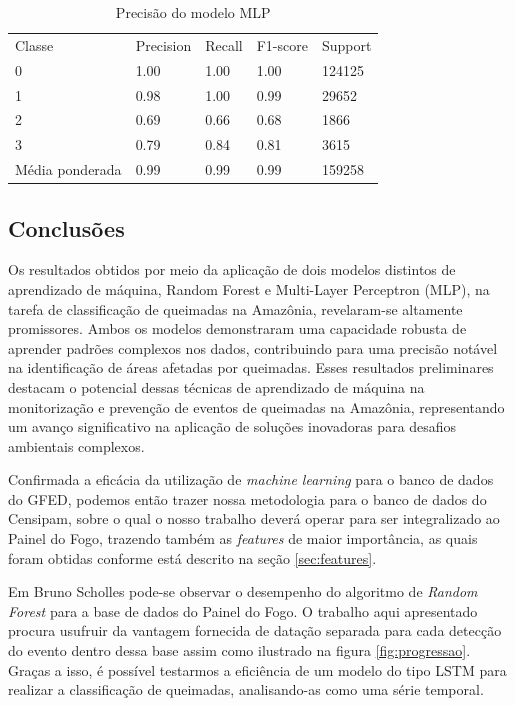 \begin{table}[H]
\centering
\caption{Precisão do modelo MLP}
\label{tab:mlp}
\begin{tabular}{lllll}
Classe          & Precision & Recall & F1-score & Support \\
0               & 1.00      & 1.00   & 1.00     & 124125  \\
1               & 0.98      & 1.00   & 0.99     & 29652   \\
2               & 0.69      & 0.66   & 0.68     & 1866    \\
3               & 0.79      & 0.84   & 0.81     & 3615    \\ \cline{1-1}
Média ponderada & 0.99      & 0.99   & 0.99     & 159258 
\end{tabular}
\end{table}

\subsection{Conclusões}

Os resultados obtidos por meio da aplicação de dois modelos distintos de aprendizado de máquina, Random Forest e Multi-Layer Perceptron (MLP), na tarefa de classificação de queimadas na Amazônia, revelaram-se altamente promissores. Ambos os modelos demonstraram uma capacidade robusta de aprender padrões complexos nos dados, contribuindo para uma precisão notável na identificação de áreas afetadas por queimadas. Esses resultados preliminares destacam o potencial dessas técnicas de aprendizado de máquina na monitorização e prevenção de eventos de queimadas na Amazônia, representando um avanço significativo na aplicação de soluções inovadoras para desafios ambientais complexos.

Confirmada a eficácia da utilização de \textit{machine learning} para o banco de dados do GFED, podemos então trazer nossa metodologia para o banco de dados do Censipam, sobre o qual o nosso trabalho deverá operar para ser integralizado ao Painel do Fogo, trazendo também as \textit{features} de maior importância, as quais foram obtidas conforme está descrito na seção \ref{sec:features}.

Em Bruno Scholles \cite{BrunoScholess2023} pode-se observar o desempenho do algoritmo de \textit{Random Forest} para a base de dados do Painel do Fogo. O trabalho aqui apresentado procura usufruir da vantagem fornecida de datação separada para cada detecção do evento dentro dessa base assim como ilustrado na figura \ref{fig:progressao}. Graças a isso, é possível testarmos a eficiência de um modelo do tipo LSTM para realizar a classificação de queimadas, analisando-as como uma série temporal.



